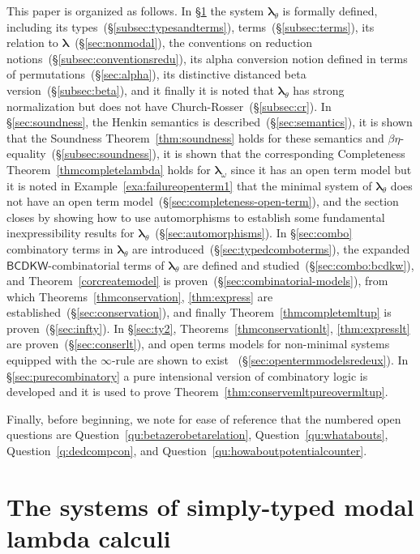 \documentclass{lmcs} %
\newcommand{\param}{\theta}
\newcommand{\mlt}[1]{\boldsymbol\lambda_{#1}}
\newcommand{\mltup}{\boldsymbol\lambda_{\param}}
\newcommand{\mltpure}{\mlt{\omega}}
\newcommand{\lt}{\boldsymbol\lambda}
\begin{document}
This paper is organized as follows. In \S\ref{sec:systems} the system $\mltup$ is formally defined, including its types~(\S\ref{subsec:typesandterms}), terms~(\S\ref{subsec:terms}), its relation to $\lt$~(\S\ref{sec:nonmodal}), the conventions on reduction notions~(\S\ref{subsec:conventionsredu}), its alpha conversion notion defined in terms of permutations~(\S\ref{sec:alpha}), its distinctive distanced beta version~(\S\ref{subsec:beta}), and it finally it is noted that $\mltup$ has strong normalization but does not have Church-Rosser~(\S\ref{subsec:cr}). In \S\ref{sec:soundness}, the Henkin semantics is described~(\S\ref{sec:semantics}), it is shown that the Soundness Theorem~\ref{thm:soundness} holds for these semantics and $\beta\eta$-equality~(\S\ref{subsec:soundness}), it is shown that the corresponding Completeness Theorem~\ref{thmcompletelambda} holds for $\mltpure$ since it has an open term model but it is noted in Example~\ref{exa:failureopenterm1} that the minimal system of $\mltup$ does not have an open term model~(\S\ref{sec:completeness-open-term}), and the section closes by showing how to use automorphisms to establish some fundamental inexpressibility results for $\mltup$~(\S\ref{sec:automorphisms}). In \S\ref{sec:combo} combinatory terms in $\mltup$ are introduced~(\S\ref{sec:typedcomboterms}), the expanded $\mathsf{BCDKW}$-combinatorial terms of $\mltup$ are defined and studied~(\S\ref{sec:combo:bcdkw}), and Theorem~\ref{corcreatemodel} is proven~(\S\ref{sec:combinatorial-models}), from which Theorems~\ref{thmconservation}, \ref{thm:express} are established~(\S\ref{sec:conservation}), and finally Theorem~\ref{thmcompletemltup} is proven~(\S\ref{sec:infty}).  In \S\ref{sec:ty2}, Theorems~\ref{thmconservationlt}, \ref{thm:expresslt} are proven~(\S\ref{sec:conserlt}), and open terms models for non-minimal systems equipped with the $\infty$-rule are shown to exist ~(\S\ref{sec:opentermmodelsredeux}). In \S\ref{sec:purecombinatory}  a pure intensional version of combinatory logic is developed and it is used to prove Theorem~\ref{thm:conservemltpureovermltup}. 

Finally, before beginning, we note for ease of reference that the numbered open questions are Question~\ref{qu:betazerobetarelation}, Question~\ref{qu:whatabouts}, Question~\ref{q:dedcompcon}, and Question~\ref{qu:howaboutpotentialcounter}.




\section{The systems of simply-typed modal lambda calculi}\label{sec:systems}
\end{document}
